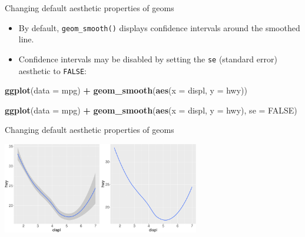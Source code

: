\documentclass[ignorenonframetext,]{beamer}
\newenvironment{Shaded}{\begin{snugshade}}{\end{snugshade}}
\newcommand{\DataTypeTok}[1]{\textcolor[rgb]{0.13,0.29,0.53}{#1}}
\newcommand{\KeywordTok}[1]{\textcolor[rgb]{0.13,0.29,0.53}{\textbf{#1}}}
\newcommand{\NormalTok}[1]{#1}
\newcommand{\OperatorTok}[1]{\textcolor[rgb]{0.81,0.36,0.00}{\textbf{#1}}}
\newcommand{\OtherTok}[1]{\textcolor[rgb]{0.56,0.35,0.01}{#1}}
\newcommand{\StringTok}[1]{\textcolor[rgb]{0.31,0.60,0.02}{#1}}
\providecommand{\tightlist}{%
  \setlength{\itemsep}{0pt}\setlength{\parskip}{0pt}}
\begin{document}
\begin{frame}[fragile]{Changing default aesthetic properties of geoms}
\protect\hypertarget{changing-default-aesthetic-properties-of-geoms-25}{}

\begin{itemize}
\tightlist
\item
  By default, \texttt{geom\_smooth()} displays confidence intervals
  around the smoothed line.
\item
  Confidence intervals may be disabled by setting the \texttt{se}
  (standard error) aesthetic to \texttt{FALSE}:
\end{itemize}

\begin{Shaded}
\begin{Highlighting}[]
\KeywordTok{ggplot}\NormalTok{(}\DataTypeTok{data =}\NormalTok{ mpg) }\OperatorTok{+}
\StringTok{  }\KeywordTok{geom_smooth}\NormalTok{(}\KeywordTok{aes}\NormalTok{(}\DataTypeTok{x =}\NormalTok{ displ, }\DataTypeTok{y =}\NormalTok{ hwy))}

\KeywordTok{ggplot}\NormalTok{(}\DataTypeTok{data =}\NormalTok{ mpg) }\OperatorTok{+}
\StringTok{  }\KeywordTok{geom_smooth}\NormalTok{(}\KeywordTok{aes}\NormalTok{(}\DataTypeTok{x =}\NormalTok{ displ, }\DataTypeTok{y =}\NormalTok{ hwy),}
    \DataTypeTok{se =} \OtherTok{FALSE}\NormalTok{)}
\end{Highlighting}
\end{Shaded}

\end{frame}

\begin{frame}{Changing default aesthetic properties of geoms}
\protect\hypertarget{changing-default-aesthetic-properties-of-geoms-26}{}

\begin{center}\includegraphics[height=150px]{data-visualization_files/figure-beamer/unnamed-chunk-59-1} \end{center}

\end{frame}
\end{document}
